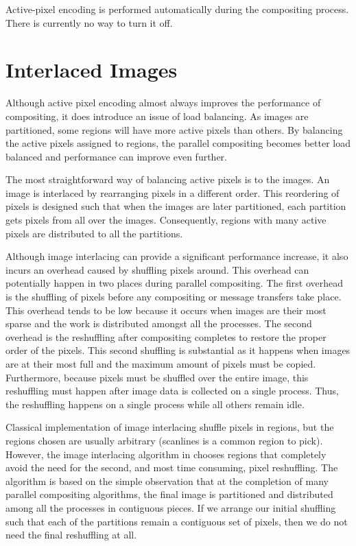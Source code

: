 Active-pixel encoding is performed automatically during the compositing
process.  There is currently no way to turn it off.


\section{Interlaced Images}
\label{sec:Customizing_Compositing:Interlaced_Images}


Although active pixel encoding almost always improves the performance of
compositing, it does introduce an issue of load balancing.  As images are
partitioned, some regions will have more active pixels than others.  By
balancing the active pixels assigned to regions, the parallel compositing
becomes better load balanced and performance can improve even further.

The most straightforward way of balancing active pixels is to
 the images.  An image is interlaced by rearranging
pixels in a different order.  This reordering of pixels is designed such
that when the images are later partitioned, each partition gets pixels from
all over the images.  Consequently, regions with many active pixels are
distributed to all the partitions.

Although image interlacing can provide a significant performance increase,
it also incurs an overhead caused by shuffling pixels around.  This
overhead can potentially happen in two places during parallel compositing.
The first overhead is the shuffling of pixels before any compositing or
message transfers take place.  This overhead tends to be low because it
occurs when images are their most sparse and the work is distributed
amongst all the processes.  The second overhead is the reshuffling after
compositing completes to restore the proper order of the pixels.  This
second shuffling is substantial as it happens when images are at their most
full and the maximum amount of pixels must be copied.  Furthermore, because
pixels must be shuffled over the entire image, this reshuffling must happen
after image data is collected on a single process.  Thus, the reshuffling
happens on a single process while all others remain idle.

Classical implementation of image interlacing shuffle pixels in regions,
but the regions chosen are usually arbitrary (scanlines is a common region
to pick).  However, the image interlacing algorithm in \IceT chooses
regions that completely avoid the need for the second, and most time
consuming, pixel reshuffling.  The algorithm is based on the simple
observation that at the completion of many parallel compositing algorithms,
the final image is partitioned and distributed among all the processes in
contiguous pieces.  If we arrange our initial shuffling such that each of
the partitions remain a contiguous set of pixels, then we do not need the
final reshuffling at all.

